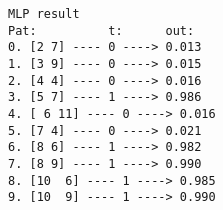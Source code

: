     \begin{Verbatim}[commandchars=\\\{\}]
       MLP result
Pat:          t:      out:
0. [2 7] ---- 0 ----> 0.013
1. [3 9] ---- 0 ----> 0.015
2. [4 4] ---- 0 ----> 0.016
3. [5 7] ---- 1 ----> 0.986
4. [ 6 11] ---- 0 ----> 0.016
5. [7 4] ---- 0 ----> 0.021
6. [8 6] ---- 1 ----> 0.982
7. [8 9] ---- 1 ----> 0.990
8. [10  6] ---- 1 ----> 0.985
9. [10  9] ---- 1 ----> 0.990
    \end{Verbatim}

    \begin{center}
    \end{center}
    { \hspace*{\fill} \\}
    
